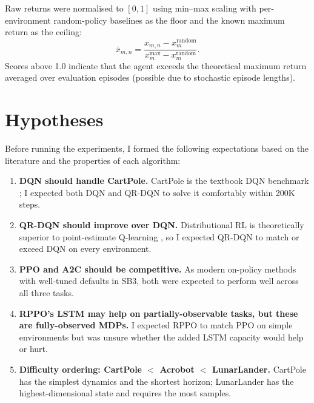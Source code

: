 Raw returns were normalised to $[0, 1]$ using min--max scaling with
per-environment random-policy baselines as the floor and the known maximum
return as the ceiling:
\[
  \bar{x}_{m,n} = \frac{x_{m,n} - x^{\text{random}}_m}
                       {x^{\max}_m - x^{\text{random}}_m}.
\]
Scores above 1.0 indicate that the agent exceeds the theoretical
maximum return averaged over evaluation episodes (possible due to
stochastic episode lengths).

\section{Hypotheses}
\label{sec:hypotheses}

Before running the experiments, I formed the following expectations based
on the literature and the properties of each algorithm:

\begin{enumerate}
  \item \textbf{DQN should handle CartPole.}
        CartPole is the textbook DQN benchmark \citep{mnih2015human};
        I expected both DQN and QR-DQN to solve it comfortably within
        200K steps.

  \item \textbf{QR-DQN should improve over DQN.}
        Distributional RL is theoretically superior to point-estimate
        Q-learning \citep{dabney2018qrdqn}, so I expected QR-DQN to
        match or exceed DQN on every environment.

  \item \textbf{PPO and A2C should be competitive.}
        As modern on-policy methods with well-tuned defaults in SB3,
        both were expected to perform well across all three tasks.

  \item \textbf{RPPO's LSTM may help on partially-observable tasks,
        but these are fully-observed MDPs.}
        I expected RPPO to match PPO on simple environments but was
        unsure whether the added LSTM capacity would help or hurt.

  \item \textbf{Difficulty ordering: CartPole $<$ Acrobot $<$
        LunarLander.}
        CartPole has the simplest dynamics and the shortest horizon;
        LunarLander has the highest-dimensional state and requires
        the most samples.
\end{enumerate}

